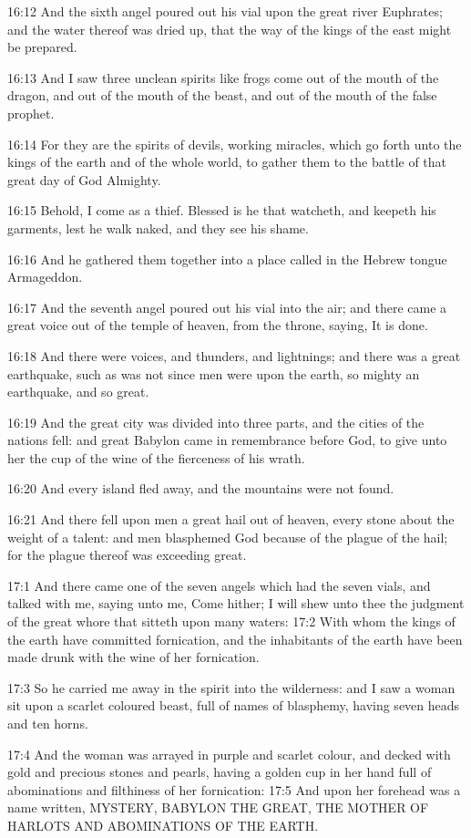 16:12 And the sixth angel poured out his vial upon the great river
Euphrates; and the water thereof was dried up, that the way of the
kings of the east might be prepared.

16:13 And I saw three unclean spirits like frogs come out of the mouth
of the dragon, and out of the mouth of the beast, and out of the mouth
of the false prophet.

16:14 For they are the spirits of devils, working miracles, which go
forth unto the kings of the earth and of the whole world, to gather
them to the battle of that great day of God Almighty.

16:15 Behold, I come as a thief. Blessed is he that watcheth, and
keepeth his garments, lest he walk naked, and they see his shame.

16:16 And he gathered them together into a place called in the Hebrew
tongue Armageddon.

16:17 And the seventh angel poured out his vial into the air; and
there came a great voice out of the temple of heaven, from the throne,
saying, It is done.

16:18 And there were voices, and thunders, and lightnings; and there
was a great earthquake, such as was not since men were upon the earth,
so mighty an earthquake, and so great.

16:19 And the great city was divided into three parts, and the cities
of the nations fell: and great Babylon came in remembrance before God,
to give unto her the cup of the wine of the fierceness of his wrath.

16:20 And every island fled away, and the mountains were not found.

16:21 And there fell upon men a great hail out of heaven, every stone
about the weight of a talent: and men blasphemed God because of the
plague of the hail; for the plague thereof was exceeding great.

17:1 And there came one of the seven angels which had the seven vials,
and talked with me, saying unto me, Come hither; I will shew unto thee
the judgment of the great whore that sitteth upon many waters: 17:2
With whom the kings of the earth have committed fornication, and the
inhabitants of the earth have been made drunk with the wine of her
fornication.

17:3 So he carried me away in the spirit into the wilderness: and I
saw a woman sit upon a scarlet coloured beast, full of names of
blasphemy, having seven heads and ten horns.

17:4 And the woman was arrayed in purple and scarlet colour, and
decked with gold and precious stones and pearls, having a golden cup
in her hand full of abominations and filthiness of her fornication:
17:5 And upon her forehead was a name written, MYSTERY, BABYLON THE
GREAT, THE MOTHER OF HARLOTS AND ABOMINATIONS OF THE EARTH.

